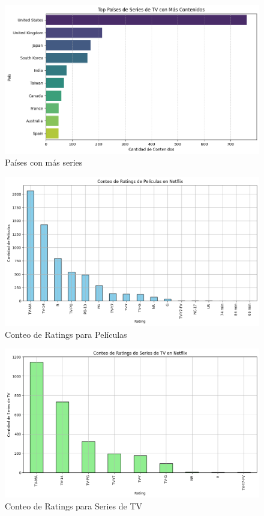 \documentclass{article}
\begin{document}
\begin{figure}[H]
    \centering
    \includegraphics[width=\textwidth]{Graphs/paises_series.png}
    \caption{Países con más series}
    \label{fig:peliculas_paises}
\end{figure}

\begin{figure}[H]
    \centering
    \includegraphics[width=\textwidth]{Graphs/conteo_rating_peliculas.png}
    \caption{Conteo de Ratings para Películas}
    \label{fig:conteo_ratings_peliculas}
\end{figure}

\begin{figure}[H]
    \centering
    \includegraphics[width=\textwidth]{Graphs/conteo_rating_series.png}
    \caption{Conteo de Ratings para Series de TV}
    \label{fig:conteo_ratings_series}
\end{figure}
\end{document}
